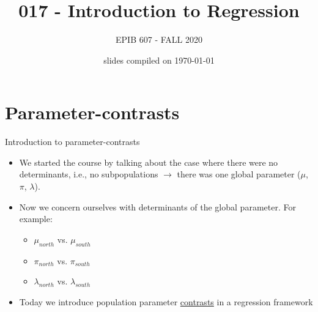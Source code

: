 \documentclass[10pt]{beamer}\usepackage[]{graphicx}\usepackage[]{color}
\begin{document}
	


	\title{017 - Introduction to Regression}
\author{EPIB 607 - FALL 2020}

\date{slides compiled on \today}

\maketitle


\section{Parameter-contrasts}

\begin{frame}{Introduction to parameter-contrasts}
	
	\begin{itemize}
		\setlength\itemsep{2em}
		\item We started the course by talking about the case where there were no determinants, i.e., no subpopulations $\to$ there was one global parameter ($\mu$, $\pi$, $\lambda$). \pause 
		\item Now we concern ourselves with determinants of the global parameter. For example:
		\begin{itemize}
			\item $\mu_{north}$ vs. $\mu_{south}$
			\item $\pi_{north}$ vs. $\pi_{south}$
			\item $\lambda_{north}$ vs. $\lambda_{south}$
		\end{itemize}
		
		\item Today we introduce population parameter \underline{contrasts} in a regression framework
		
	\end{itemize}
	
\end{frame}
\end{document}

